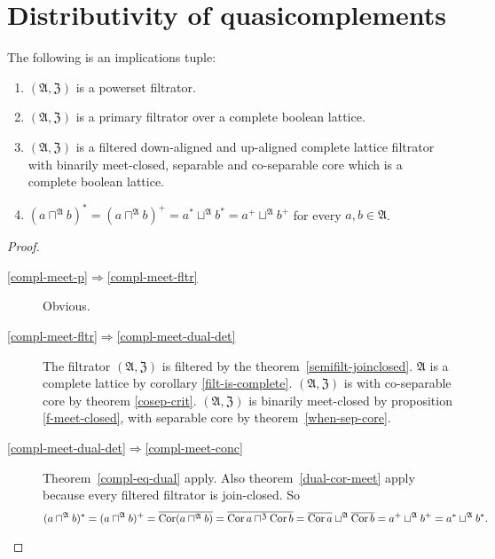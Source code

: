 \section{Distributivity of quasicomplements}
\begin{thm}
\label{f-compl-meet}The following is an implications tuple:
\begin{enumerate}
\item \label{compl-meet-p}$(\mathfrak{A},\mathfrak{Z})$ is a powerset
filtrator.
\item \label{compl-meet-fltr}$(\mathfrak{A},\mathfrak{Z})$ is a primary
filtrator over a complete boolean lattice.
\item \label{compl-meet-dual-det}$(\mathfrak{A},\mathfrak{Z})$ is a filtered down-aligned and up-aligned
complete lattice filtrator with binarily meet-closed, separable and
co-separable core which is a complete boolean lattice.
\item \label{compl-meet-conc}$(a\sqcap^{\mathfrak{A}}b)^{\ast}=(a\sqcap^{\mathfrak{A}}b)^{+}=a^{\ast}\sqcup^{\mathfrak{A}}b^{\ast}=a^{+}\sqcup^{\mathfrak{A}}b^{+}$
for every $a,b\in\mathfrak{A}$.
\end{enumerate}
\end{thm}
\begin{proof}
~
\begin{description}
\item [{\ref{compl-meet-p}$\Rightarrow$\ref{compl-meet-fltr}}] Obvious.

\item [{\ref{compl-meet-fltr}$\Rightarrow$\ref{compl-meet-dual-det}}] The
filtrator $(\mathfrak{A},\mathfrak{Z})$ is filtered by the theorem~\ref{semifilt-joinclosed}.
$\mathfrak{A}$ is a complete lattice by corollary \ref{filt-is-complete}.
$(\mathfrak{A},\mathfrak{Z})$ is with co-separable core by theorem
\ref{cosep-crit}.
$(\mathfrak{A},\mathfrak{Z})$ is
binarily meet-closed by proposition \ref{f-meet-closed}, with separable
core by theorem~\ref{when-sep-core}.


\item [{\ref{compl-meet-dual-det}$\Rightarrow$\ref{compl-meet-conc}}]
Theorem~\ref{compl-eq-dual} apply.
Also theorem~\ref{dual-cor-meet} apply because every filtered filtrator is join-closed.
So
\[
(a\sqcap^{\mathfrak{A}}b)^{\ast}=(a\sqcap^{\mathfrak{A}}b)^{+}=\overline{\operatorname{Cor}(a\sqcap^{\mathfrak{A}}b)}=\overline{\operatorname{Cor} a\sqcap^{\mathfrak{Z}}\operatorname{Cor} b}=\overline{\operatorname{Cor} a}\sqcup^{\mathfrak{A}}\overline{\operatorname{Cor} b}=a^{+}\sqcup^{\mathfrak{A}}b^{+}=a^{\ast}\sqcup^{\mathfrak{A}}b^{\ast}.
\]
\end{description}
\end{proof}


